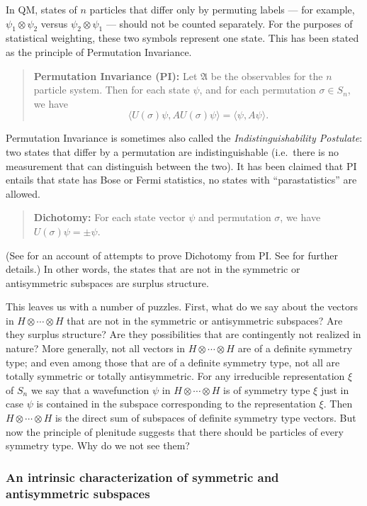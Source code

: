 \documentclass[12pt]{article}
\theoremstyle{definition}
\theoremstyle{definition}
\theoremstyle{remark}
\def\al#1{{\mathfrak #1}}
\begin{document}
In QM, states of $n$ particles that differ only by permuting labels
--- for example, $\psi _1\otimes \psi _2$ versus $\psi _2\otimes \psi
_1$ --- should not be counted separately.  For the purposes of
statistical weighting, these two symbols represent one state.  This
has been stated as the principle of Permutation Invariance.
\begin{quote}
  \textbf{Permutation Invariance (PI):} Let $\al A$ be the observables
  for the $n$ particle system.  Then for each state $\psi$, and for
  each permutation $\sigma \in S_n$, we have
$$ \langle U(\sigma)\psi ,AU(\sigma )\psi \rangle = \langle \psi
,A\psi \rangle .$$ 
\end{quote}
Permutation Invariance is sometimes also called the
\emph{Indistinguishability Postulate}: two states that differ by a
permutation are indistinguishable (i.e.\ there is no measurement that
can distinguish between the two).  It has been claimed that PI entails
that state has Bose or Fermi statistics, no states with
``parastatistics'' are allowed.
\begin{quote}
  \textbf{Dichotomy:} For each state vector $\psi$ and permutation
  $\sigma$, we have $U(\sigma )\psi =\pm \psi$.
\end{quote}
(See \cite[pp.\ 389ff]{bas} for an account of attempts to prove
Dichotomy from PI.  See \cite{jb} for further details.)  In other
words, the states that are not in the symmetric or antisymmetric
subspaces are surplus structure.

This leaves us with a number of puzzles.  First, what do we say about
the vectors in $H\otimes \cdots \otimes H$ that are not in the
symmetric or antisymmetric subspaces?  Are they surplus structure?
Are they possibilities that are contingently not realized in nature?
More generally, not all vectors in $H\otimes \cdots \otimes H$ are of
a definite symmetry type; and even among those that are of a definite
symmetry type, not all are totally symmetric or totally antisymmetric.
For any irreducible representation $\xi$ of $S_n$ we say that a
wavefunction $\psi$ in $H\otimes \cdots \otimes H$ is of symmetry type
$\xi$ just in case $\psi$ is contained in the subspace corresponding
to the representation $\xi$.  Then $H\otimes \cdots \otimes H$ is the
direct sum of subspaces of definite symmetry type vectors. But now the
principle of plenitude suggests that there should be particles of
every symmetry type.  Why do we not see them?


\subsubsection{An intrinsic characterization of symmetric and
  antisymmetric subspaces}
\end{document}
